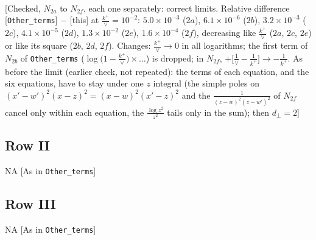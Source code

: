 \documentclass[9pt]{article}
\numberwithin{equation}{section}
\begin{document}
\begin{align}
\end{align} {\color{red}[Checked, $N_{2a}$ to $N_{2f}$, each one separately: correct limits. Relative difference [\texttt{Other\_terms}] $-$ [this] at $\frac{k^{+}}{\vee}=10^{-2}$: $5.0\times10^{-3}$ ($2a$), $6.1\times10^{-6}$ ($2b$), $3.2\times10^{-3}$ ($2c$), $4.1\times10^{-5}$ ($2d$), $1.3\times10^{-2}$ ($2e$), $1.6\times10^{-4}$ ($2f$), decreasing like $\frac{k^{+}}{\vee}$ ($2a$, $2c$, $2e$) or like its square ($2b$, $2d$, $2f$). Changes: $\frac{k^{+}}{\vee}\to0$ in all logarithms; the first term of $N_{2b}$ of \texttt{Other\_terms} ($\log\big(1-\frac{k^{+}}{\vee}\big)\times\dots$) is dropped; in $N_{2f}$, $+\big[\frac{1}{\vee}-\frac{1}{k^{+}}\big]\to-\frac{1}{k^{+}}$. As before the limit (earlier check, not repeated): the terms of each equation, and the six equations, have to stay under one $z$ integral (the simple poles on $(x'-w')^{2}(x-z)^{2}=(x-w)^{2}(x'-z)^{2}$ and the $\frac{1}{(z-w)^{2}(z-w')^{2}}$ of $N_{2f}$ cancel only within each equation, the $\frac{\log z^{2}}{z^{2}}$ tails only in the sum); then $d_{\perp}=2$]}\par\noindent
\subsection{Row II}
\textsc{NA} {\color{red}[As in \texttt{Other\_terms}]}
\subsection{Row III}
\textsc{NA} {\color{red}[As in \texttt{Other\_terms}]}
\end{document}
